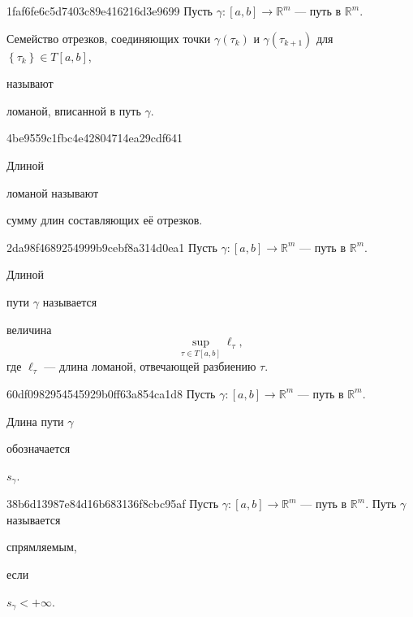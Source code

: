 \begin{note}{1faf6fe6c5d7403c89e416216d3e9699}
    Пусть \({ \gamma : [a, b] \to \mathbb R^{m} }\) --- путь в \({ \mathbb R^{m} }\).
    \begin{icloze}{1}Семейство отрезков, соединяющих точки \({ \gamma(\tau_k) }\) и \({ \gamma(\tau_{k + 1}) }\) для \({ \left\{ \tau_k \right\} \in T[a, b] }\),\end{icloze} называют \begin{icloze}{2}ломаной, вписанной в путь \({ \gamma }\).\end{icloze}
\end{note}

\begin{note}{4be9559c1fbc4e42804714ea29cdf641}
    \begin{icloze}{2}Длиной\end{icloze} ломаной называют \begin{icloze}{1}сумму длин составляющих её отрезков.\end{icloze}
\end{note}

\begin{note}{2da98f4689254999b9cebf8a314d0ea1}
    Пусть \({ \gamma : [a, b] \to \mathbb R^{m} }\) --- путь в \({ \mathbb R^{m} }\).
    \begin{icloze}{2}Длиной\end{icloze} пути \({ \gamma }\) называется
    \begin{icloze}{1}
        величина
        \[
            \underset{\tau \in T[a, b]}{\sup} \ell_\tau,
        \]
        где \({ \ell_\tau }\) --- длина ломаной, отвечающей разбиению \({ \tau }\).
    \end{icloze}
\end{note}

\begin{note}{60df0982954545929b0ff63a854ca1d8}
    Пусть \({ \gamma : [a, b] \to \mathbb R^{m} }\) --- путь в \({ \mathbb R^{m} }\).
    \begin{icloze}{2}Длина пути \({ \gamma }\)\end{icloze} обозначается \begin{icloze}{1}\({ s_\gamma }\).\end{icloze}
\end{note}

\begin{note}{38b6d13987e84d16b683136f8cbc95af}
    Пусть \({ \gamma : [a, b] \to \mathbb R^{m} }\) --- путь в \({ \mathbb R^{m} }\).
    Путь \({ \gamma }\) называется \begin{icloze}{2}спрямляемым,\end{icloze} если \begin{icloze}{1}\({ s_\gamma < +\infty }\).\end{icloze}
\end{note}

